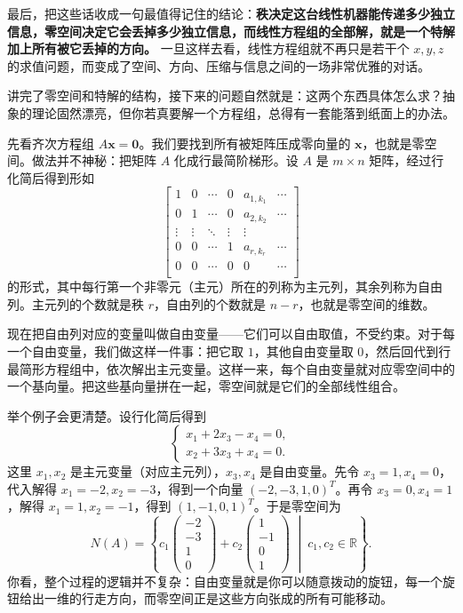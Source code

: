 \documentclass[UTF8]{ctexbook}
\begin{document}
最后，把这些话收成一句最值得记住的结论：\textbf{秩决定这台线性机器能传递多少独立信息，零空间决定它会丢掉多少独立信息，而线性方程组的全部解，就是一个特解加上所有被它丢掉的方向。} 一旦这样去看，线性方程组就不再只是若干个 $x,y,z$ 的求值问题，而变成了空间、方向、压缩与信息之间的一场非常优雅的对话。

讲完了零空间和特解的结构，接下来的问题自然就是：这两个东西具体怎么求？抽象的理论固然漂亮，但你若真要解一个方程组，总得有一套能落到纸面上的办法。

先看齐次方程组 $A\mathbf{x}=\mathbf{0}$。我们要找到所有被矩阵压成零向量的 $\mathbf{x}$，也就是零空间。做法并不神秘：把矩阵 $A$ 化成行最简阶梯形。设 $A$ 是 $m\times n$ 矩阵，经过行化简后得到形如
\[
\left[\begin{array}{cccccc}
1 & 0 & \cdots & 0 & a_{1,k_1} & \cdots \\
0 & 1 & \cdots & 0 & a_{2,k_2} & \cdots \\
\vdots & \vdots & \ddots & \vdots & \vdots & \\
0 & 0 & \cdots & 1 & a_{r,k_r} & \cdots \\
0 & 0 & \cdots & 0 & 0 & \cdots \\
\end{array}\right]
\]
的形式，其中每行第一个非零元（主元）所在的列称为主元列，其余列称为自由列。主元列的个数就是秩 $r$，自由列的个数就是 $n-r$，也就是零空间的维数。

现在把自由列对应的变量叫做自由变量——它们可以自由取值，不受约束。对于每一个自由变量，我们做这样一件事：把它取 $1$，其他自由变量取 $0$，然后回代到行最简形方程组中，依次解出主元变量。这样一来，每个自由变量就对应零空间中的一个基向量。把这些基向量拼在一起，零空间就是它们的全部线性组合。

举个例子会更清楚。设行化简后得到
\[
\begin{cases}
x_1 + 2x_3 - x_4 = 0,\\
x_2 + 3x_3 + x_4 = 0.
\end{cases}
\]
这里 $x_1,x_2$ 是主元变量（对应主元列），$x_3,x_4$ 是自由变量。先令 $x_3=1,x_4=0$，代入解得 $x_1=-2,x_2=-3$，得到一个向量 $(-2,-3,1,0)^T$。再令 $x_3=0,x_4=1$，解得 $x_1=1,x_2=-1$，得到 $(1,-1,0,1)^T$。于是零空间为
\[
N(A)=\left\{c_1\begin{pmatrix}-2\\-3\\1\\0\end{pmatrix}+c_2\begin{pmatrix}1\\-1\\0\\1\end{pmatrix}\;\middle|\;c_1,c_2\in\mathbb{R}\right\}.
\]
你看，整个过程的逻辑并不复杂：自由变量就是你可以随意拨动的旋钮，每一个旋钮给出一维的行走方向，而零空间正是这些方向张成的所有可能移动。
\end{document}
